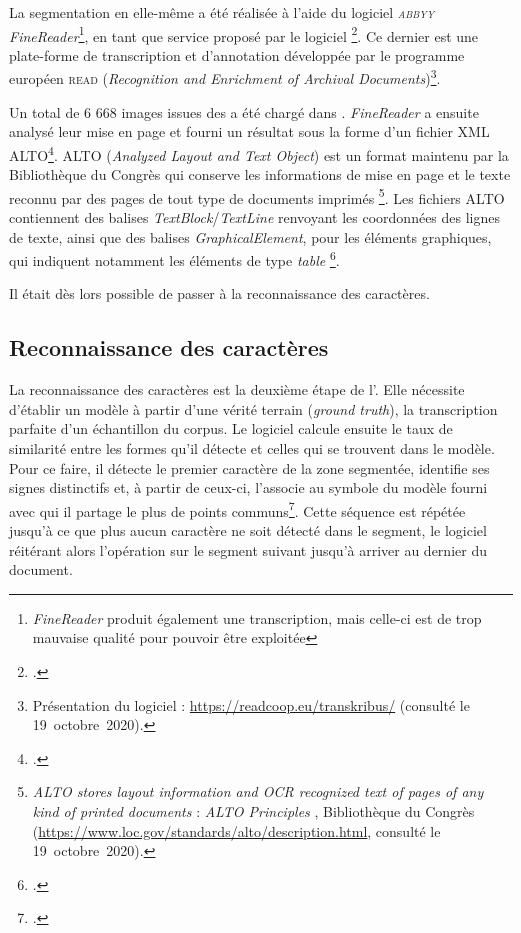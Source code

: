 La segmentation en elle-même a été réalisée à l'aide du logiciel \textit{\textsc{abbyy} FineReader}\footnote{\textit{FineReader} produit également une transcription, mais celle-ci est de trop mauvaise qualité pour pouvoir être exploitée}, en tant que service proposé par le logiciel \transkribus{}\footcite{chague2}. Ce dernier est une plate-forme de transcription et d’annotation développée par le programme européen \textsc{read} (\textit{Recognition and Enrichment of Archival Documents})\footnote{Présentation du logiciel : \url{https://readcoop.eu/transkribus/} (consulté le 19~octobre~2020).}.

Un total de 6 668 images issues des \odm{} a été chargé dans \transkribus{}. \textit{FineReader} a ensuite analysé leur mise en page et fourni un résultat sous la forme d'un fichier XML ALTO\footcite{alto}. ALTO (\textit{Analyzed Layout and Text Object}) est un format maintenu par la Bibliothèque du Congrès qui \og conserve les informations de mise en page et le texte reconnu par \ocr{} des pages de tout type de documents imprimés \fg\footnote{\og \textit{ALTO stores layout information and OCR recognized text of pages of any kind of printed documents} \fg{} : \og \textit{ALTO Principles} \fg, Bibliothèque du Congrès (\url{https://www.loc.gov/standards/alto/description.html}, consulté le 19~octobre~2020).}. Les fichiers ALTO contiennent \og des balises \textit{TextBlock}/\textit{TextLine} renvoyant les coordonnées des lignes de texte, ainsi que des balises \textit{GraphicalElement}, pour les éléments graphiques, qui indiquent notamment les éléments de type \textit{table} \fg\footcite{chague2}.

Il était dès lors possible de passer à la reconnaissance des caractères.

\subsection{Reconnaissance des caractères}

La reconnaissance des caractères est la deuxième étape de l'\ocr. Elle nécessite d'établir un modèle à partir d'une \og vérité terrain \fg{} (\textit{ground truth}), \cad{} la transcription parfaite d'un échantillon du corpus. Le logiciel calcule ensuite le taux de similarité entre les formes qu'il détecte et celles qui se trouvent dans le modèle. Pour ce faire, il détecte le premier caractère de la zone segmentée, identifie ses signes distinctifs et, à partir de ceux-ci, l'associe au symbole du modèle fourni avec qui il partage le plus de points communs\footcite[p.~3]{casey}. Cette séquence est répétée jusqu'à ce que plus aucun caractère ne soit détecté dans le segment, le logiciel réitérant alors l'opération sur le segment suivant jusqu'à arriver au dernier du document.


